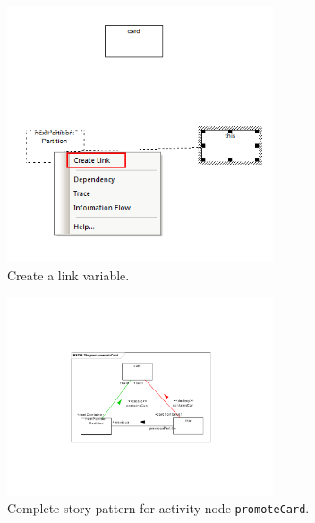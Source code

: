 \begin{figure}[htp]
\begin{center}
  \includegraphics[width=0.7\textwidth]{pics/sdmBilder/check/sdm26}
  \caption{Create a link variable.}  
  \label{fig:sdm_check_link_variable}
\end{center}
\end{figure}

\begin{figure}[htp]
\begin{center}
  \includegraphics[width=0.7\textwidth]{pics/sdmBilder/check/sdm30}
  \caption{Complete story pattern for activity node \texttt{promoteCard}.}  
  \label{fig:sdm_check_complete_activity_node}
\end{center}
\end{figure}

